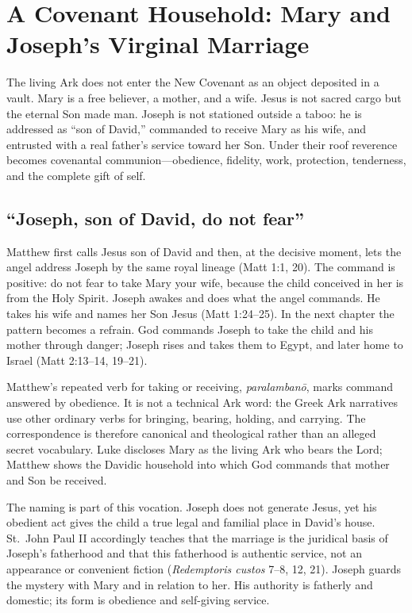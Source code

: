 \section{A Covenant Household: Mary and Joseph's Virginal Marriage}

The living Ark does not enter the New Covenant as an object deposited in a
vault.  Mary is a free believer, a mother, and a wife.  Jesus is not sacred
cargo but the eternal Son made man.  Joseph is not stationed outside a taboo:
he is addressed as ``son of David,'' commanded to receive Mary as his wife,
and entrusted with a real father's service toward her Son.  Under their roof
reverence becomes covenantal communion---obedience, fidelity, work,
protection, tenderness, and the complete gift of self.


\subsection{``Joseph, son of David, do not fear''}

Matthew first calls Jesus son of David and then, at the decisive moment, lets
the angel address Joseph by the same royal lineage (Matt 1:1, 20).  The command
is positive: do not fear to take Mary your wife, because the child conceived
in her is from the Holy Spirit.  Joseph awakes and does what the angel
commands.  He takes his wife and names her Son Jesus (Matt 1:24--25).  In the
next chapter the pattern becomes a refrain.  God commands Joseph to take the
child and his mother through danger; Joseph rises and takes them to Egypt, and
later home to Israel (Matt 2:13--14, 19--21).

Matthew's repeated verb for taking or receiving, \emph{paralamban\=o}, marks
command answered by obedience.  It is not a technical Ark word: the Greek Ark
narratives use other ordinary verbs for bringing, bearing, holding, and
carrying.  The correspondence is therefore canonical and theological rather
than an alleged secret vocabulary.  Luke discloses Mary as the living Ark who
bears the Lord; Matthew shows the Davidic household into which God commands
that mother and Son be received.

The naming is part of this vocation.  Joseph does not generate Jesus, yet his
obedient act gives the child a true legal and familial place in David's house.
St.~John Paul II accordingly teaches that the marriage is the juridical basis
of Joseph's fatherhood and that this fatherhood is authentic service, not an
appearance or convenient fiction (\emph{Redemptoris custos} 7--8, 12, 21).
Joseph guards the mystery with Mary and in relation to her.  His authority is
fatherly and domestic; its form is obedience and self-giving service.

